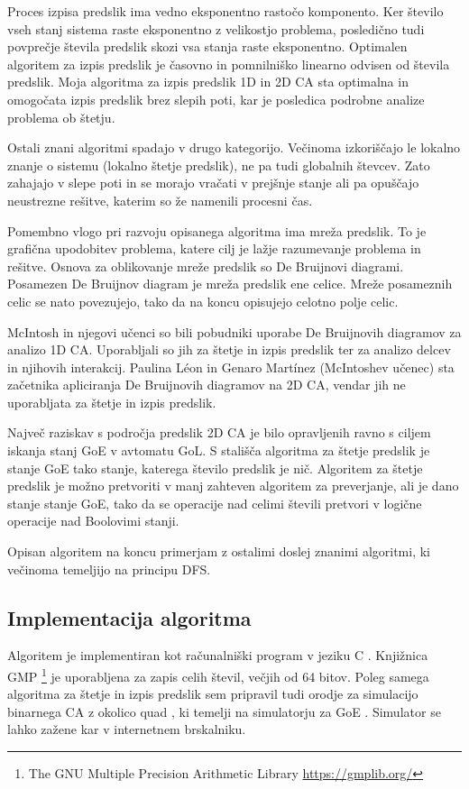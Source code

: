 \documentclass[12pt,a4paper,openany,twoside]{book}
\begin{document}
Proces izpisa predslik ima vedno eksponentno rastočo komponento.
Ker število vseh stanj sistema raste eksponentno z velikostjo problema,
posledično tudi povprečje števila predslik skozi vsa stanja raste eksponentno.
Optimalen algoritem za izpis predslik je časovno in pomnilniško linearno odvisen od števila predslik.
Moja algoritma za izpis predslik 1D in 2D CA sta optimalna in
omogočata izpis predslik brez slepih poti,
kar je posledica podrobne analize problema ob štetju.

Ostali znani algoritmi spadajo v drugo kategorijo.
Večinoma izkoriščajo le lokalno znanje o sistemu (lokalno štetje predslik),
ne pa tudi globalnih števcev.
Zato zahajajo v slepe poti in se morajo vračati v prejšnje stanje
ali pa opuščajo neustrezne rešitve, katerim so že namenili procesni čas.

Pomembno vlogo pri razvoju opisanega algoritma ima mreža predslik.
To je grafična upodobitev problema, katere cilj je lažje razumevanje problema in rešitve.
Osnova za oblikovanje mreže predslik so De Bruijnovi diagrami.
Posamezen De Bruijnov diagram je mreža predslik ene celice.
Mreže posameznih celic se nato povezujejo,
tako da na koncu opisujejo celotno polje celic.

McIntosh in njegovi učenci so bili pobudniki uporabe De Bruijnovih diagramov za analizo 1D CA.
Uporabljali so jih za štetje in izpis predslik ter za analizo delcev in njihovih interakcij.
Paulina Léon in Genaro Martínez (McIntoshev učenec) \cite{PaulinaGenaro2016}
sta začetnika apliciranja De Bruijnovih diagramov na 2D CA,
vendar jih ne uporabljata za štetje in izpis predslik.

Največ raziskav s področja predslik 2D CA je bilo opravljenih ravno s ciljem iskanja stanj GoE v avtomatu GoL.
S stališča algoritma za štetje predslik je stanje GoE tako stanje, katerega število predslik je nič.
Algoritem za štetje predslik je možno pretvoriti v manj zahteven algoritem za preverjanje, ali je dano stanje stanje GoE,
tako da se operacije nad celimi števili pretvori v logične operacije nad Boolovimi stanji.

Opisan algoritem na koncu primerjam z ostalimi doslej znanimi algoritmi,
ki večinoma temeljijo na principu DFS.

\subsection{Implementacija algoritma}

Algoritem je implementiran kot računalniški program v jeziku C \cite{Jeras2016-algirithm}.
Knjižnica GMP \footnote{The GNU Multiple Precision Arithmetic Library \url{https://gmplib.org/}}
je uporabljena za zapis celih števil, večjih od 64 bitov.
Poleg samega algoritma za štetje in izpis predslik sem pripravil tudi
orodje za simulacijo binarnega CA z okolico quad \cite{Jeras2016-quad},
ki temelji na simulatorju za GoE \cite{webgl-gol}.
Simulator se lahko zažene kar v internetnem brskalniku.
\end{document}

